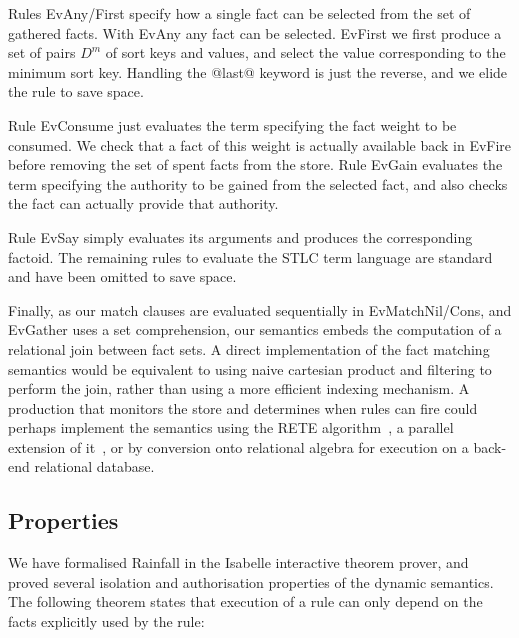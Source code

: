 Rules EvAny/First specify how a single fact can be selected from the set of gathered facts. With EvAny any fact can be selected. EvFirst we first produce a set of pairs $D^m$ of sort keys and values, and select the value corresponding to the minimum sort key. Handling the @last@ keyword is just the reverse, and we elide the rule to save space.

Rule EvConsume just evaluates the term specifying the fact weight to be consumed. We check that a fact of this weight is actually available back in EvFire before removing the set of spent facts from the store. Rule EvGain evaluates the term specifying the authority to be gained from the selected fact, and also checks the fact can actually provide that authority.

Rule EvSay simply evaluates its arguments and produces the corresponding factoid. The remaining rules to evaluate the STLC term language are standard and have been omitted to save space.

Finally, as our match clauses are evaluated sequentially in EvMatchNil/Cons, and EvGather uses a set comprehension, our semantics embeds the computation of a relational join between fact sets. A direct implementation of the fact matching semantics would be equivalent to using naive cartesian product and filtering to perform the join, rather than using a more efficient indexing mechanism. A production that monitors the store and determines when rules can fire could perhaps implement the semantics using the RETE algorithm~\cite{Forgy1981:RETE, Doorenbos1995:ProductionMatching}, a parallel extension of it~\cite{Aref1998:LanaMatch}, or by conversion onto relational algebra for execution on a back-end relational database.




\eject{}
\subsection{Properties}

We have formalised Rainfall in the Isabelle interactive theorem prover, and proved several isolation and authorisation properties of the dynamic semantics.
The following theorem states that execution of a rule can only depend on the facts explicitly used by the rule:

